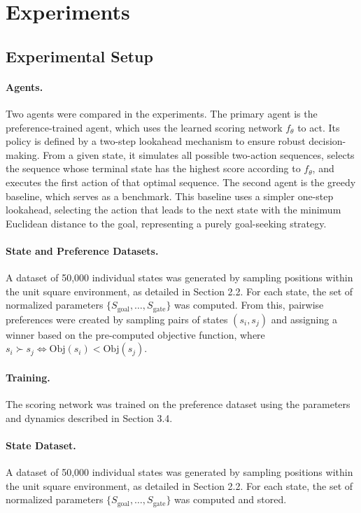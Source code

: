 \documentclass[a4paper,oneside,10pt,ngerman,english]{scrartcl}
\begin{document}
\section{Experiments}
\label{sec:experiments}

\subsection{Experimental Setup}

\paragraph{Agents.}
Two agents were compared in the experiments. The primary agent is the preference-trained agent, which uses the learned scoring network $f_\theta$ to act. Its policy is defined by a two-step lookahead mechanism to ensure robust decision-making. From a given state, it simulates all possible two-action sequences, selects the sequence whose terminal state has the highest score according to $f_\theta$, and executes the first action of that optimal sequence. The second agent is the greedy baseline, which serves as a benchmark. This baseline uses a simpler one-step lookahead, selecting the action that leads to the next state with the minimum Euclidean distance to the goal, representing a purely goal-seeking strategy.

\paragraph{State and Preference Datasets.}
A dataset of 50,000 individual states was generated by sampling positions within the unit square environment, as detailed in Section 2.2. For each state, the set of normalized parameters $\{S_{\text{goal}}, \dots, S_{\text{gate}}\}$ was computed. From this, pairwise preferences were created by sampling pairs of states $(s_i, s_j)$ and assigning a winner based on the pre-computed objective function, where $s_i \succ s_j \iff \mathrm{Obj}(s_i) < \mathrm{Obj}(s_j)$.

\paragraph{Training.}
The scoring network was trained on the preference dataset using the parameters and dynamics described in Section 3.4.

\paragraph{State Dataset.}
A dataset of 50,000 individual states was generated by sampling positions within the unit square environment, as detailed in Section 2.2. For each state, the set of normalized parameters $\{S_{\text{goal}}, \dots, S_{\text{gate}}\}$ was computed and stored.
\end{document}
